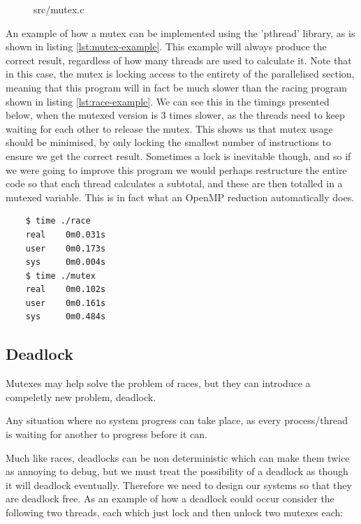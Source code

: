\begin{figure}
  
  {src/mutex.c}
\end{figure}

An example of how a mutex can be implemented using the 'pthread' library, as is shown in listing \ref{lst:mutex-example}. This example will always produce the correct result, regardless of how many threads are used to calculate it. Note that in this case, the mutex is locking access to the entirety of the parallelised section, meaning that this program will in fact be much slower than the racing program shown in listing \ref{lst:race-example}. We can see this in the timings presented below, when the mutexed version is 3 times slower, as the threads need to keep waiting for each other to release the mutex. This shows us that mutex usage should be minimised, by only locking the smallest number of instructions to ensure we get the correct result. Sometimes a lock is inevitable though, and so if we were going to improve this program we would perhaps restructure the entire code so that each thread calculates a subtotal, and these are then totalled in a mutexed variable. This is in fact what an OpenMP reduction automatically does.

\begin{minipage}{1.0\linewidth}
  \begin{verbatim}
    $ time ./race
    real    0m0.031s
    user    0m0.173s
    sys     0m0.004s
    $ time ./mutex
    real    0m0.102s
    user    0m0.161s
    sys     0m0.484s
  \end{verbatim}
\end{minipage}

\subsection{Deadlock}

Mutexes may help solve the problem of races, but they can introduce a compeletly new problem, deadlock. 

\begin{definition}[Deadlock]
  Any situation where no system progress can take place, as every process/thread is waiting for another to progress before it can.
\end{definition}

Much like races, deadlocks can be non deterministic which can make them twice as annoying to debug, but we must treat the possibility of a deadlock as though it will deadlock eventually. Therefore we need to design our systems so that they are deadlock free. As an example of how a deadlock could occur consider the following two threads, each which just lock and then unlock two mutexes each:


